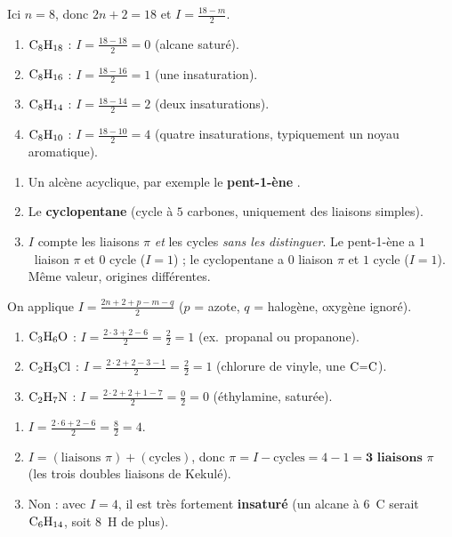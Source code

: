 \documentclass[11pt,a4paper]{article}
\begin{document}
\begin{corrige}
Ici $n=8$, donc $2n+2=18$ et $I=\frac{18-m}{2}$.
\begin{enumerate}[label=\alph*)]
  \item $\ce{C8H18}$ : $I=\frac{18-18}{2}=0$ (alcane saturé).
  \item $\ce{C8H16}$ : $I=\frac{18-16}{2}=1$ (une insaturation).
  \item $\ce{C8H14}$ : $I=\frac{18-14}{2}=2$ (deux insaturations).
  \item $\ce{C8H10}$ : $I=\frac{18-10}{2}=4$ (quatre insaturations, typiquement un noyau aromatique).
\end{enumerate}
\end{corrige}

\begin{corrige}
\begin{enumerate}[label=\alph*)]
  \item Un alcène acyclique, par exemple le \textbf{pent-1-ène} .
  \item Le \textbf{cyclopentane} (cycle à $5$ carbones, uniquement des liaisons simples).
  \item $I$ compte les liaisons $\pi$ \emph{et} les cycles \emph{sans les distinguer}. Le pent-1-ène a $1$~liaison $\pi$ et $0$ cycle ($I=1$) ; le cyclopentane a $0$ liaison $\pi$ et $1$ cycle ($I=1$). Même valeur, origines différentes.
\end{enumerate}
\end{corrige}

\begin{corrige}
On applique $I=\frac{2n+2+p-m-q}{2}$ ($p$ = azote, $q$ = halogène, oxygène ignoré).
\begin{enumerate}[label=\alph*)]
  \item $\ce{C3H6O}$ : $I=\frac{2\cdot3+2-6}{2}=\frac{2}{2}=1$ (ex.\ propanal ou propanone).
  \item $\ce{C2H3Cl}$ : $I=\frac{2\cdot2+2-3-1}{2}=\frac{2}{2}=1$ (chlorure de vinyle, une $\ce{C=C}$).
  \item $\ce{C2H7N}$ : $I=\frac{2\cdot2+2+1-7}{2}=\frac{0}{2}=0$ (éthylamine, saturée).
\end{enumerate}
\end{corrige}

\begin{corrige}
\begin{enumerate}[label=\alph*)]
  \item $I=\frac{2\cdot6+2-6}{2}=\frac{8}{2}=4$.
  \item $I=(\text{liaisons }\pi)+(\text{cycles})$, donc $\pi = I-\text{cycles}=4-1=\textbf{3 liaisons }\pi$ (les trois doubles liaisons de Kekulé).
  \item Non : avec $I=4$, il est très fortement \textbf{insaturé} (un alcane à $6$~C serait $\ce{C6H14}$, soit $8$~H de plus).
\end{enumerate}
\end{corrige}
\end{document}
